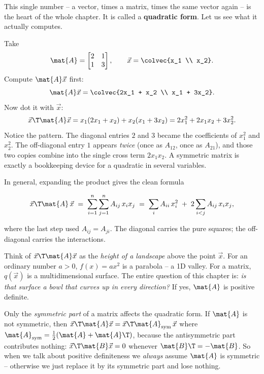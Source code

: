 This single number -- a vector, times a matrix, times the same vector again -- is the heart of the
whole chapter. It is called a \textbf{quadratic form}. Let us see what it actually computes.

\begin{example}
\label{ch27:ex-unpack}
Take
\[
  \mat{A} = \begin{bmatrix} 2 & 1 \\ 1 & 3 \end{bmatrix}, \qquad
  \vec{x} = \colvec{x_1 \\ x_2}.
\]
Compute $\mat{A}\vec{x}$ first:
\[
  \mat{A}\vec{x} = \colvec{2x_1 + x_2 \\ x_1 + 3x_2}.
\]
Now dot it with $\vec{x}$:
\[
  \vec{x}\T \mat{A}\vec{x}
  = x_1(2x_1 + x_2) + x_2(x_1 + 3x_2)
  = 2x_1^2 + 2x_1 x_2 + 3x_2^2.
\]
Notice the pattern. The diagonal entries $2$ and $3$ became the coefficients of $x_1^2$ and
$x_2^2$. The off-diagonal entry $1$ appears \emph{twice} (once as $A_{12}$, once as $A_{21}$), and
those two copies combine into the single cross term $2 x_1 x_2$. A symmetric matrix is exactly a
bookkeeping device for a quadratic in several variables.
\end{example}

In general, expanding the product gives the clean formula

\[
  \vec{x}\T \mat{A}\, \vec{x} \;=\; \sum_{i=1}^n \sum_{j=1}^n A_{ij}\, x_i x_j
  \;=\; \sum_i A_{ii}\, x_i^2 \;+\; 2\sum_{i<j} A_{ij}\, x_i x_j,
\]

where the last step used $A_{ij} = A_{ji}$. The diagonal carries the pure squares; the
off-diagonal carries the interactions.

\begin{intuitionbox}
Think of $\vec{x}\T\mat{A}\vec{x}$ as the \emph{height of a landscape} above the point $\vec{x}$.
For an ordinary number $a>0$, $f(x) = ax^2$ is a parabola -- a 1D valley. For a matrix, $q(\vec{x})$
is a multidimensional surface. The entire question of this chapter is: \emph{is that surface a bowl
that curves up in every direction?} If yes, $\mat{A}$ is positive definite.
\end{intuitionbox}

\begin{trapbox}
Only the \emph{symmetric part} of a matrix affects the quadratic form. If $\mat{A}$ is not
symmetric, then $\vec{x}\T\mat{A}\vec{x} = \vec{x}\T \mat{A}_{\text{sym}}\,\vec{x}$ where
$\mat{A}_{\text{sym}} = \tfrac12(\mat{A} + \mat{A}\T)$, because the antisymmetric part contributes
nothing: $\vec{x}\T \mat{B}\vec{x} = 0$ whenever $\mat{B}\T = -\mat{B}$. So when we talk about
positive definiteness we \emph{always} assume $\mat{A}$ is symmetric -- otherwise we just replace it
by its symmetric part and lose nothing.
\end{trapbox}

